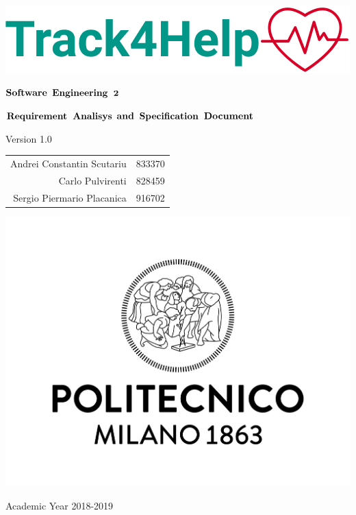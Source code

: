 \documentclass{article}
\author{
\and
\and
}
\date{}
\title{}
\begin{document}

\thispagestyle{empty} %
\begin{center}
	\includegraphics[scale=0.8]{images/mockup/logo.png}

	

	\vspace{3cm}

	\large $\bf \large Software$ $\bf Engineering$ $\bf 2$

	\vspace{3mm}

	\LARGE $\bf Requirement$  $\bf Analisys$ $\bf and$ $\bf Specification$ $\bf Document$

	\vspace{2mm}
	\small Version 1.0

	\vspace{1cm}

	\begin{tabular}{r|l}
		\large Andrei Constantin Scutariu & \large 833370\\
		\large Carlo Pulvirenti & \large 828459\\
		\large Sergio Piermario Placanica & \large 916702\\
	\end{tabular}

	\vspace{3cm}
	
	\includegraphics[scale=0.15]{images/logoPolimi.jpg}
	
	\vspace{3mm}
	Academic Year 2018-2019


	\end{center}
\end{document}
